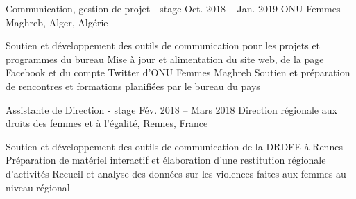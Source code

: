 \begin{joblist}

\item[Communication, gestion de projet - stage]{Oct. 2018 -- Jan. 2019 }     
	{ONU Femmes Maghreb, Alger, Algérie}     
	{
			 
		\vspace{-0.5cm}
		\begin{itemize}
			  \iftbftiny \setlength\itemsep{-3pt} \fi
			  \cvitem[\checkmark] Soutien et développement des outils de communication pour les projets et programmes du bureau      
 			  \cvitem[\checkmark] Mise à jour et alimentation du site web, de la page Facebook et du compte Twitter d’ONU Femmes Maghreb                                                            
			  \cvitem[\checkmark] Soutien et préparation de rencontres et formations planifiées par le bureau du pays
		\end{itemize}      

	}


\item[Assistante de Direction - stage]{Fév. 2018 -- Mars 2018 }     
	{Direction régionale aux droits des femmes et à l'égalité, Rennes, France}     
	{
			 
		\iftbftiny \vspace{-0.5cm} \fi
		\begin{itemize}
			  \iftbftiny \setlength\itemsep{-3pt} \fi
			  \cvitem[\checkmark] Soutien et développement des outils de communication de la DRDFE à Rennes      
			  \cvitem[\checkmark] Préparation de matériel interactif et élaboration d'une restitution régionale d'activités
			  \cvitem[\checkmark] Recueil et analyse des données sur les violences faites aux femmes au niveau régional
		\end{itemize}      

}
\end{joblist}
